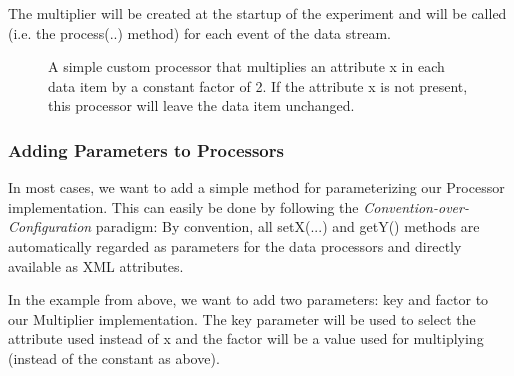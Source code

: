 \begin{figure}[h!]
\end{figure}

The multiplier will be created at the startup of the experiment and
will be called (i.e. the {\ttfamily process(..)} method) for each
event of the data stream.

\begin{figure}[h!]
\caption{\label{fig:multiplyImpl}A simple custom processor that
  multiplies an attribute {\ttfamily x} in each data item by a
  constant factor of 2. If the attribute {\ttfamily x} is not present,
  this processor will leave the data item unchanged.}
\end{figure}


\subsubsection{Adding Parameters to Processors}
In most cases, we want to add a simple method for parameterizing our
Processor implementation. This can easily be done by following the
{\em Convention-over-Configuration} paradigm: By convention, all
{\ttfamily setX(...)} and {\ttfamily getY()} methods are automatically
regarded as parameters for the data processors and directly available
as XML attributes.

In the example from above, we want to add two parameters: {\ttfamily
key} and {\ttfamily factor} to our Multiplier implementation. The
{\ttfamily key} parameter will be used to select the attribute used
instead of {\ttfamily x} and the {\ttfamily factor} will be a value
used for multiplying (instead of the constant {} as above).

